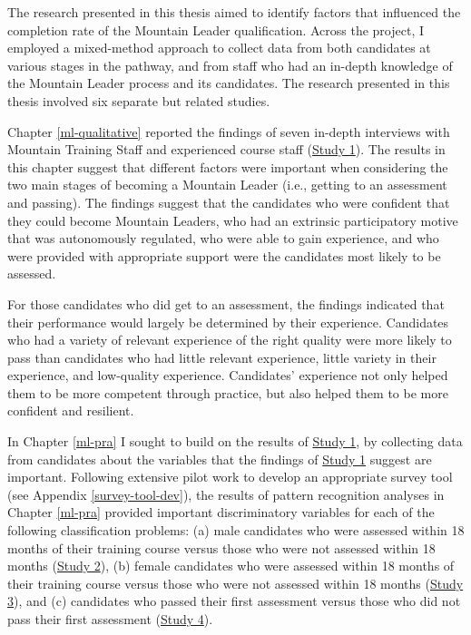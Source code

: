 \documentclass[
  12pt,
  a4paper,
]{book}
\begin{document}
The research presented in this thesis aimed to identify factors that influenced the completion rate of the Mountain Leader qualification. Across the project, I employed a mixed-method approach to collect data from both candidates at various stages in the pathway, and from staff who had an in-depth knowledge of the Mountain Leader process and its candidates. The research presented in this thesis involved six separate but related studies.

Chapter \ref{ml-qualitative} reported the findings of seven in-depth interviews with Mountain Training Staff and experienced course staff (\protect\hyperlink{ml-qualitative}{Study 1}). The results in this chapter suggest that different factors were important when considering the two main stages of becoming a Mountain Leader (i.e., getting to an assessment and passing). The findings suggest that the candidates who were confident that they could become Mountain Leaders, who had an extrinsic participatory motive that was autonomously regulated, who were able to gain experience, and who were provided with appropriate support were the candidates most likely to be assessed.

For those candidates who did get to an assessment, the findings indicated that their performance would largely be determined by their experience. Candidates who had a variety of relevant experience of the right quality were more likely to pass than candidates who had little relevant experience, little variety in their experience, and low-quality experience. Candidates' experience not only helped them to be more competent through practice, but also helped them to be more confident and resilient.

In Chapter \ref{ml-pra} I sought to build on the results of \protect\hyperlink{ml-qualitative}{Study 1}, by collecting data from candidates about the variables that the findings of \protect\hyperlink{ml-qualitative}{Study 1} suggest are important. Following extensive pilot work to develop an appropriate survey tool (see Appendix \ref{survey-tool-dev}), the results of pattern recognition analyses in Chapter \ref{ml-pra} provided important discriminatory variables for each of the following classification problems: (a) male candidates who were assessed within 18 months of their training course versus those who were not assessed within 18 months (\protect\hyperlink{male-gta}{Study 2}), (b) female candidates who were assessed within 18 months of their training course versus those who were not assessed within 18 months (\protect\hyperlink{female-gta}{Study 3}), and (c) candidates who passed their first assessment versus those who did not pass their first assessment (\protect\hyperlink{ftp}{Study 4}).
\end{document}
